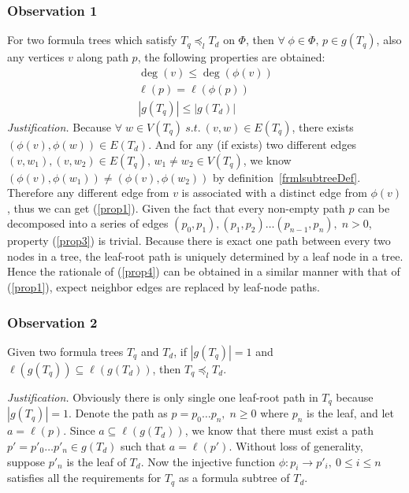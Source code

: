 \documentclass{acm_proc_article-sp}
\begin{document}
\subsubsection{Observation 1} 
\label{observation1}
For two formula trees which satisfy $T_q \preceq_l T_d$ on $\Phi$, then $\forall\; \phi \in \Phi,\, p \in g(T_q)$, also any vertices $v$ along path $p$, the following properties are obtained:
\begin{eqnarray}
\deg(v) \le \deg(\phi(v)) \label{prop1} \\
\ell(p) = \ell(\phi(p)) \label{prop3} \\
\left| g(T_q) \right| \le \left| g(T_d) \right| \label{prop4}
\end{eqnarray}
\textit{Justification.} 
Because $\forall\; w \in V(T_q) \  s.t. \  (v, w) \in E(T_q)$, there exists $(\phi(v), \phi(w)) \in E(T_d)$. 
And for any (if exists) two different edges $(v, w_1), (v, w_2) \in E(T_q),\, w_1 \not= w_2 \in V(T_q) $, we know $(\phi(v), \phi(w_1)) \not= (\phi(v), \phi(w_2))$ by definition~\ref{frmlsubtreeDef}. 
Therefore any different edge from $v$ is associated with a distinct edge from $\phi(v)$, thus we can get (\ref{prop1}). 
Given the fact that every non-empty path $p$ can be decomposed into a series of edges $(p_0, p_1), (p_1, p_2) \ldots (p_{n-1}, p_n), \; n > 0$,
property (\ref{prop3}) is trivial.
Because there is exact one path between every two nodes in a tree, the leaf-root path is uniquely determined by a leaf node in a tree. Hence the rationale of (\ref{prop4}) can be obtained in a similar manner with that of (\ref{prop1}), expect neighbor edges are replaced by leaf-node paths.


\subsubsection{Observation 2} 
\label{observation2}
Given two formula trees $T_q$ and $T_d$, if $\left| g(T_q) \right| = 1$ and $\ell(g(T_{q})) \subseteq \ell(g(T_d))$, then $T_q \preceq_l T_d$.

\noindent \textit{Justification.} 
Obviously there is only single one leaf-root path in $T_q$ because $\left| g(T_q) \right| = 1$. 
Denote the path as $p = p_0 \ldots p_n,\; n \ge 0$ where $p_n$ is the leaf, and let $a = \ell(p)$.
Since $a \subseteq \ell(g(T_d))$, we know that there must exist a path $p'=p'_0 \ldots p'_n \in g(T_d)$ such that $a = \ell(p')$.
Without loss of generality, suppose $p'_n$ is the leaf of $T_d$. 
Now the injective function $\phi: p_i \rightarrow p'_i,\  0 \le i \le n$ satisfies all the requirements for $T_q$ as a formula subtree of $T_d$.
\end{document}
